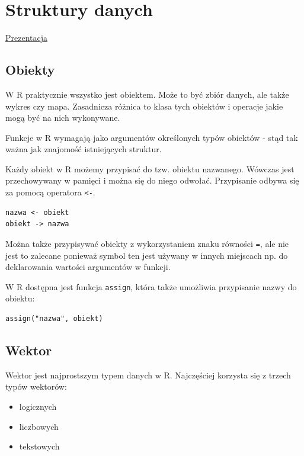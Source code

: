 \documentclass[
]{book}
\providecommand{\tightlist}{%
  \setlength{\itemsep}{0pt}\setlength{\parskip}{0pt}}
\begin{document}
\hypertarget{struktury-danych}{%
\chapter{Struktury danych}\label{struktury-danych}}

\href{presentations/01a_typy_danych.html}{Prezentacja}

\hypertarget{obiekty}{%
\section{Obiekty}\label{obiekty}}

W R praktycznie wszystko jest obiektem. Może to być zbiór danych, ale także wykres czy mapa. Zasadnicza różnica to klasa tych obiektów i operacje jakie mogą być na nich wykonywane.

Funkcje w R wymagają jako argumentów określonych typów obiektów - stąd tak ważna jak znajomość istniejących struktur.

Każdy obiekt w R możemy przypisać do tzw. obiektu nazwanego. Wówczas jest przechowywany w pamięci i można się do niego odwołać. Przypisanie odbywa się za pomocą operatora \texttt{\textless{}-}.

\begin{verbatim}
nazwa <- obiekt
obiekt -> nazwa
\end{verbatim}

Można także przypisywać obiekty z wykorzystaniem znaku równości \texttt{=}, ale nie jest to zalecane ponieważ symbol ten jest używany w innych miejscach np. do deklarowania wartości argumentów w funkcji.

W R dostępna jest funkcja \texttt{assign}, która także umożliwia przypisanie nazwy do obiektu:

\begin{verbatim}
assign("nazwa", obiekt)
\end{verbatim}

\hypertarget{wektor}{%
\section{Wektor}\label{wektor}}

Wektor jest najprostszym typem danych w R. Najczęściej korzysta się z trzech typów wektorów:

\begin{itemize}
\tightlist
\item
  logicznych
\item
  liczbowych
\item
  tekstowych
\end{itemize}
\end{document}
